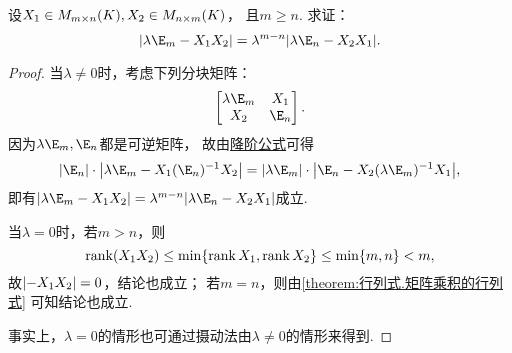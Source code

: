 \begin{example}\label{example:单位矩阵与两矩阵乘积之差.单位矩阵与两矩阵乘积之差的行列式}
设\(X_1 \in M_{m \times n}(K),
X_2 \in M_{n \times m}(K)\)，
且\(m \geq n\).
求证：\begin{equation}
	\abs{\lambda\E_m-\A\B} = \lambda^{m-n} \abs{\lambda\E_n-\B\A}.
\end{equation}
\begin{proof}
当\(\lambda\neq0\)时，考虑下列分块矩阵：\[
	\begin{bmatrix}
		\lambda\E_m & \A \\
		\B & \E_n
	\end{bmatrix}.
\]
因为\(\lambda\E_m,\E_n\)都是可逆矩阵，
故由\hyperref[theorem:逆矩阵.行列式降阶定理]{降阶公式}可得\[
	\abs{\E_n} \cdot \abs{\lambda\E_m - \A (\E_n)^{-1} \B}
	= \abs{\lambda\E_m} \cdot \abs{\E_n - \B (\lambda\E_m)^{-1} \A},
\]
即有\(\abs{\lambda\E_m-\A\B} = \lambda^{m-n} \abs{\lambda\E_n-\B\A}\)成立.

当\(\lambda=0\)时，若\(m>n\)，则\[
	\rank(X_1X_2) \leq \min\{\rank X_1,\rank X_2\} \leq \min\{m,n\} < m,
\]
故\(\abs{-X_1X_2}=0\)，结论也成立；
若\(m = n\)，则由\cref{theorem:行列式.矩阵乘积的行列式} 可知结论也成立.

事实上，\(\lambda=0\)的情形也可通过摄动法由\(\lambda\neq0\)的情形来得到.
\end{proof}
\end{example}

